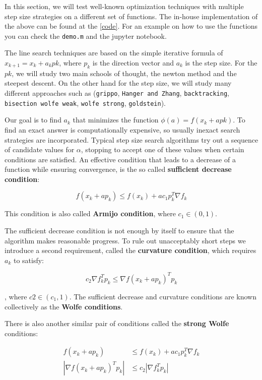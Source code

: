 \documentclass[a4paper,11pt]{article}
\numberwithin{equation}{section} %
\begin{document}
In this section, we will test well-known optimization techniques with multiple step size strategies on a different set of functions. 
The in-house implementation of the above can be found at the \ref{code}.
For an example on how to use the functions you can check the \verb|demo.m| and the jupyter notebook.

The line search techniques are based on the simple iterative formula of $x_{k+1} = x_k + a_k pk$, where $p_k$ is the direction vector and $a_k$ is the step size. For the $pk$, we will study two main schools of thought, the newton method and the steepest descent. On the other hand for the step size, we will study many different approaches such as (\verb|grippo|, \verb|Hanger and Zhang|, \verb|backtracking|, \verb|bisection wolfe weak|, \verb|wolfe strong|, \verb|goldstein|). 

Our goal is to find $a_k$ that minimizes the function $\phi (a) = f(x_k + a pk)$. To find an exact answer is computationally expensive, so usually inexact search strategies are incorporated. Typical step size search algorithms try out a sequence of candidate values for $\alpha$, stopping to
accept one of these values when certain conditions are satisfied.
An effective condition that leads to a decrease of a function while ensuring convergence, is the so called \textbf{sufficient decrease condition}:

\begin{equation}
f(x_k + a p_k) \leq f(x_k) + a  c_1 p_k^T \nabla f_k
\end{equation}

This condition is also called \textbf{Armijo condition}, where $c_1 \in (0,1)$.

The sufficient decrease condition is not enough by itself to ensure that the algorithm
makes reasonable progress. To rule out unacceptably short steps we introduce a second requirement,
called the \textbf{curvature condition}, which requires $a_k$ to satisfy:

\begin{equation}
c_2 \nabla f_k^Tp_k \le \nabla f(x_k + a p_k)^T p_k
\end{equation}

, where $c2 \in (c_1,1)$. The sufficient decrease and curvature conditions are known collectively as the \textbf{Wolfe
conditions}.

There is also another similar pair of conditions called the \textbf{strong Wolfe} conditions:

\begin{align}
f(x_k + a p_k) &\leq f(x_k) + a  c_1 p_k^T \nabla f_k \\
|\nabla f(x_k + a p_k)^T p_k| &\le c_2  |\nabla f_k^Tp_k|
\end{align}
\end{document}
